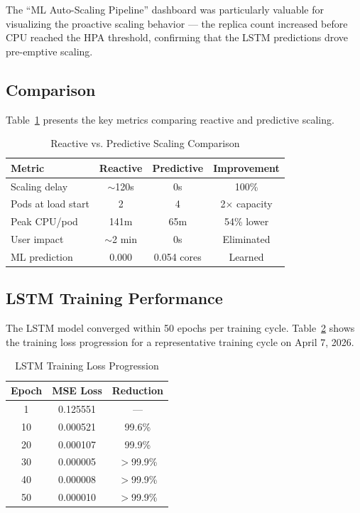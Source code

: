 \documentclass[journal]{IEEEtran}
\begin{document}
The ``ML Auto-Scaling Pipeline'' dashboard was particularly valuable for visualizing the proactive scaling behavior --- the replica count increased before CPU reached the HPA threshold, confirming that the LSTM predictions drove pre-emptive scaling.

\subsection{Comparison}
Table~\ref{tab:comparison} presents the key metrics comparing reactive and predictive scaling.

\begin{table}[h]
\centering
\caption{Reactive vs. Predictive Scaling Comparison}
\label{tab:comparison}
\begin{tabular}{@{}lccc@{}}
\toprule
\textbf{Metric} & \textbf{Reactive} & \textbf{Predictive} & \textbf{Improvement} \\
\midrule
Scaling delay & $\sim$120s & 0s & 100\% \\
Pods at load start & 2 & 4 & 2$\times$ capacity \\
Peak CPU/pod & 141m & 65m & 54\% lower \\
User impact & $\sim$2 min & 0s & Eliminated \\
ML prediction & 0.000 & 0.054 cores & Learned \\
\bottomrule
\end{tabular}
\end{table}

\subsection{LSTM Training Performance}
The LSTM model converged within 50 epochs per training cycle. Table~\ref{tab:training} shows the training loss progression for a representative training cycle on April 7, 2026.

\begin{table}[h]
\centering
\caption{LSTM Training Loss Progression}
\label{tab:training}
\begin{tabular}{@{}ccc@{}}
\toprule
\textbf{Epoch} & \textbf{MSE Loss} & \textbf{Reduction} \\
\midrule
1 & 0.125551 & --- \\
10 & 0.000521 & 99.6\% \\
20 & 0.000107 & 99.9\% \\
30 & 0.000005 & $>$99.9\% \\
40 & 0.000008 & $>$99.9\% \\
50 & 0.000010 & $>$99.9\% \\
\bottomrule
\end{tabular}
\end{table}
\end{document}
